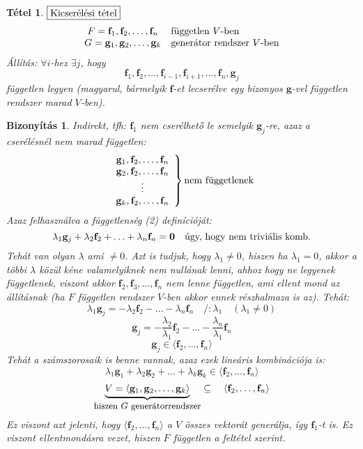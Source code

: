 \documentclass[a4paper,12pt,twoside]{book}
\newcommand{\vek}[1]{\mathbf{#1}} %
\newcommand{\lista}[2]{{#1}_{1}, {#1}_{2}, \ldots, {#1}_{#2}}
\newcommand{\gen}[1]{\langle #1 \rangle}
\newcommand{\linkomb}[3]{#2_1\vek{#1}_{1} + #2_2\vek{#1}_{2} + \ldots + #2_{#3}\vek{#1}_{#3}}
\newtheorem{tetel}{Tétel}[chapter]
\theoremstyle{break}
\newtheorem{bizNL}[biz]{Bizonyítás}
\begin{document}
\begin{tetel}$\boxed{$Kicserélési tétel$}$
\[\begin{array}{cl}
F = \lista{\vek{f}}{n} & \hbox{független $V$-ben} \\
G = \lista{\vek{g}}{k} & \hbox{generátor rendszer $V$-ben}
\end{array}\]
Állítás: $\forall i$-hez $\exists j$, hogy
\[\lista{\vek{f}}{i-1},\vek{f}_{i+1},\ldots,\vek{f}_n,\vek{g}_j\]
független legyen (magyarul, bármelyik $\vek{f}$-et lecserélve egy bizonyos $\vek{g}$-vel független rendszer marad $V$-ben).
\end{tetel}
\begin{bizNL}
Indirekt, tfh: $\vek{f}_1$ nem cserélhető le semelyik $\vek{g}_j$-re, azaz a cserélésnél nem marad független:
\[\left.\begin{array}{c}
    \vek{g}_1,\vek{f}_2,\ldots,\vek{f}_n \\
    \vek{g}_2,\vek{f}_2,\ldots,\vek{f}_n \\
    \vdots \\
    \vek{g}_k,\vek{f}_2,\ldots,\vek{f}_n
  \end{array}\right\} \hbox{nem függetlenek}
\]
Azaz felhasználva a függetlenség (2) definícióját:
\[\lambda_1\vek{g}_j+\lambda_2\vek{f}_2+\ldots+\lambda_n\vek{f}_n=\vek{0} \quad \hbox{úgy, hogy nem triviális komb.}\]
Tehát van olyan $\lambda$ ami $\neq 0$. Azt is tudjuk, hogy $\lambda_1\neq 0$, hiszen ha $\lambda_1=0$, akkor a többi $\lambda$ közül kéne valamelyiknek nem nullának lenni, ahhoz hogy ne legyenek függetlenek, viszont akkor $\vek{f}_2,\vek{f}_3,\ldots,\vek{f}_n$ nem lenne független, ami ellent mond az állításnak (ha $F$ független rendszer $V$-ben akkor ennek részhalmaza is az). Tehát:\\
\[\lambda_1\vek{g}_j = -\lambda_2\vek{f}_2-\ldots-\lambda_n\vek{f}_n \quad /:\lambda_1 \quad (\lambda_1 \neq 0)\]
\[\vek{g}_j = -\frac{\lambda_2}{\lambda_1}\vek{f}_2-\ldots-\frac{\lambda_n}{\lambda_1}\vek{f}_n\]
\[\vek{g}_j \in \gen{ \vek{f}_2, \ldots, \vek{f}_n }\]
Tehát a számszorosaik is benne vannak, azaz ezek lineáris kombinációja is:
\[\linkomb{g}{\lambda}{k} \in \gen{ \vek{f}_2, \ldots, \vek{f}_n }\]
\[\underbrace{V=\gen{\lista{\vek{g}}{k}}}_{\hbox{\small hiszen $G$ generátorrendszer}} \subseteq \quad \gen{\vek{f}_2, \ldots, \vek{f}_n }\]
Ez viszont azt jelenti, hogy $\gen{ \vek{f}_2, \ldots, \vek{f}_n }$ a $V$ összes vektorát generálja, így $\vek{f}_1$-t is. Ez viszont ellentmondásra vezet, hiszen $F$ független a feltétel szerint.
\end{bizNL}
\end{document}
